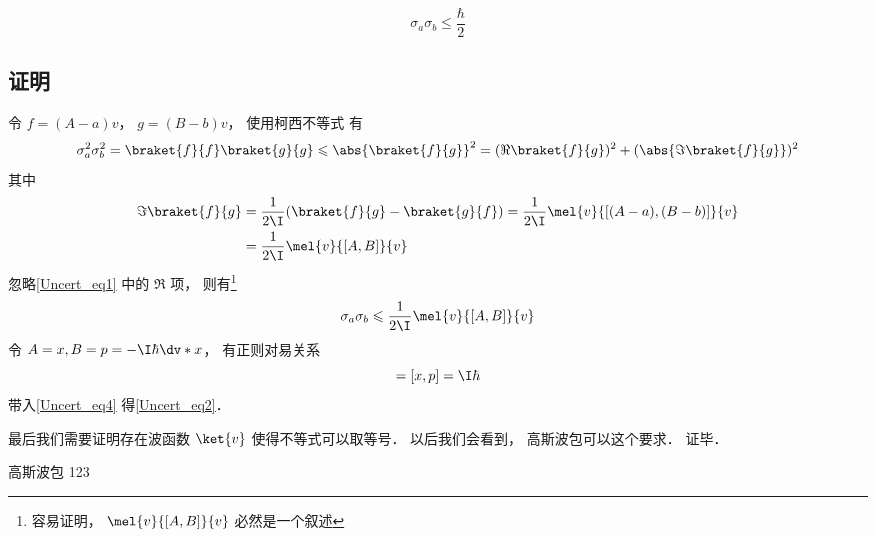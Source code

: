 

\begin{equation}\label{Uncert_eq2}
\sigma_a \sigma_b \leqslant \frac{\hbar}{2}
\end{equation}

\subsection{证明}
令 $f = (A-a)v$， $g = (B-b)v$， 使用柯西不等式 有
\begin{equation}\label{Uncert_eq1}
\sigma_a^2 \sigma_b^2 = \braket{f}{f} \braket{g}{g} \leqslant \abs{\braket{f}{g}}^2 = (\Re\braket{f}{g})^2 + (\abs{\Im\braket{f}{g}})^2
\end{equation}
其中
\begin{equation}
\begin{aligned}
\Im\braket{f}{g} &= \frac{1}{2\I}(\braket{f}{g} - \braket{g}{f})
= \frac{1}{2\I}\mel{v}{[(A-a), (B-b)]}{v}\\
&= \frac{1}{2\I}\mel{v}{[A, B]}{v}
\end{aligned}
\end{equation}
忽略\autoref{Uncert_eq1} 中的 $\Re$ 项， 则有\footnote{容易证明， $\mel{v}{[A, B]}{v}$ 必然是一个叙述}
\begin{equation}\label{Uncert_eq4}
\sigma_a \sigma_b \leqslant \frac{1}{2\I}\mel{v}{[A, B]}{v}
\end{equation}
令 $A = x, B = p = -\I\hbar \dv*{x}$， 有正则对易关系
\begin{equation}
[A, B] = [x, p] = \I\hbar
\end{equation}
带入\autoref{Uncert_eq4} 得\autoref{Uncert_eq2}． 

最后我们需要证明存在波函数 $\ket{v}$ 使得不等式可以取等号． 以后我们会看到， 高斯波包可以这个要求．%
证毕．

\begin{example}{高斯波包}
123
\end{example}
